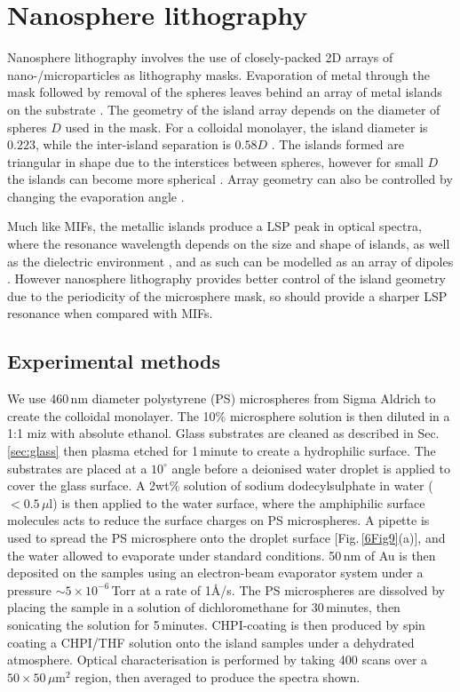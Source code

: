 \section{Nanosphere lithography}
Nanosphere lithography involves the use of closely-packed 2D arrays of nano-/microparticles as lithography masks. Evaporation of metal through the mask followed by removal of the spheres leaves behind an array of metal islands on the substrate \cite{Haynes2001}. The geometry of the island array depends on the diameter of spheres $D$ used in the mask. For a colloidal monolayer, the island diameter is $0.223$, while the inter-island separation is $0.58D$ \cite{Hulteen1995}. The islands formed are triangular in shape due to the interstices between spheres, however for small $D$ the islands can become more spherical \cite{Hulteen1999}. Array geometry can also be controlled by changing the evaporation angle \cite{Haynes2002}.

Much like MIFs, the metallic islands produce a LSP peak in optical spectra, where the resonance wavelength depends on the size and shape of islands, as well as the dielectric environment \cite{Jensen2000}, and as such can be modelled as an array of dipoles \cite{Malinsky2001, Jensen1999}. However nanosphere lithography provides better control of the island geometry due to the periodicity of the microsphere mask, so should provide a sharper LSP resonance when compared with MIFs.

\subsection{Experimental methods}
We use 460\,nm diameter polystyrene (PS) microspheres from Sigma Aldrich to create the colloidal monolayer. The 10\% microsphere solution is then diluted in a 1:1 miz with absolute ethanol. Glass substrates are cleaned as described in Sec.\,\ref{sec:glass} then plasma etched for 1\,minute to create a hydrophilic surface. The substrates are placed at a $10^{\circ}$ angle before a deionised water droplet is applied to cover the glass surface. A 2wt\% solution of sodium dodecylsulphate in water ($<0.5\,\mu$l) is then applied to the water surface, where the amphiphilic surface molecules acts to reduce the surface charges on PS microspheres. A pipette is used to spread the PS microsphere onto the droplet surface [Fig.\,\ref{6Fig9}(a)], and the water allowed to evaporate under standard conditions. 50\,nm of Au is then deposited on the samples using an electron-beam evaporator system under a pressure $\sim5\times10^{-6}$\,Torr at a rate of 1\AA/s. The PS microspheres are dissolved by placing the sample in a solution of dichloromethane for 30\,minutes, then sonicating the solution for 5\,minutes. CHPI-coating is then produced by spin coating a CHPI/THF solution onto the island samples under a dehydrated atmosphere. Optical characterisation is performed by taking 400 scans over a $50\times50\,\mu$m$^{2}$ region, then averaged to produce the spectra shown. 

